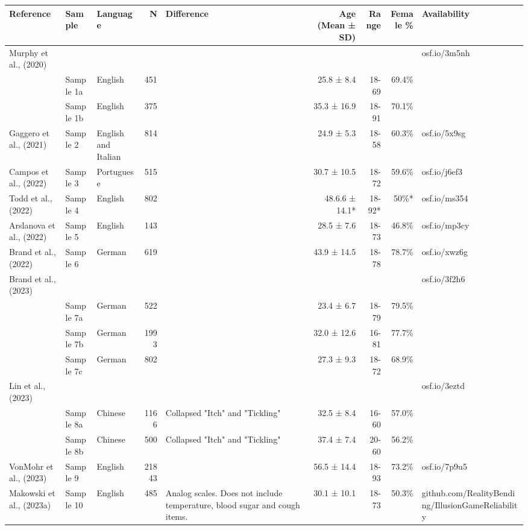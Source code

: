 \begin{table}[!t]
\fontsize{6.8pt}{8.1pt}\selectfont
\begin{tabular*}{\linewidth}{@{\extracolsep{\fill}}lllrlrrrl}
\toprule
Reference & Sample & Language & N & Difference & Age (Mean  ± SD) & Range & Female \% & Availability \\ 
\midrule\addlinespace[2.5pt]
Murphy et al., (2020) &  &  &  &  &  &  &  & osf.io/3m5nh \\ 
 & Sample 1a & English & 451 &  & 25.8 ± 8.4 & 18-69 & 69.4\% &  \\ 
 & Sample 1b & English & 375 &  & 35.3 ± 16.9 & 18-91 & 70.1\% &  \\ 
Gaggero et al., (2021) & Sample 2 & English and Italian & 814 &  & 24.9 ± 5.3 & 18-58 & 60.3\% & osf.io/5x9sg \\ 
Campos et al., (2022) & Sample 3 & Portuguese & 515 &  & 30.7 ± 10.5 & 18-72 & 59.6\% & osf.io/j6ef3 \\ 
Todd et al., (2022) & Sample 4 & English & 802 &  & 48.6.6 ± 14.1* & 18-92* & 50\%* & osf.io/ms354 \\ 
Arslanova et al., (2022) & Sample 5 & English & 143 &  & 28.5 ± 7.6 & 18-73 & 46.8\% & osf.io/mp3cy \\ 
Brand et al., (2022) & Sample 6 & German & 619 &  & 43.9 ± 14.5 & 18-78 & 78.7\% & osf.io/xwz6g \\ 
Brand et al., (2023) &  &  &  &  &  &  &  & osf.io/3f2h6 \\ 
 & Sample 7a & German & 522 &  & 23.4 ± 6.7 & 18-79 & 79.5\% &  \\ 
 & Sample 7b & German & 1993 &  & 32.0 ± 12.6 & 16-81 & 77.7\% &  \\ 
 & Sample 7c & German & 802 &  & 27.3 ± 9.3 & 18-72 & 68.9\% &  \\ 
Lin et al., (2023) &  &  &  &  &  &  &  & osf.io/3eztd \\ 
 & Sample 8a & Chinese & 1166 & Collapsed "Itch" and "Tickling" & 32.5 ± 8.4 & 16-60 & 57.0\% &  \\ 
 & Sample 8b & Chinese & 500 & Collapsed "Itch" and "Tickling" & 37.4 ± 7.4 & 20-60 & 56.2\% &  \\ 
VonMohr et al., (2023) & Sample 9 & English & 21843 &  & 56.5 ± 14.4 & 18-93 & 73.2\% & osf.io/7p9u5 \\ 
Makowski et al., (2023a) & Sample 10 & English & 485 & Analog scales. Does not include temperature, blood sugar and cough items. & 30.1 ± 10.1 & 18-73 & 50.3\% & github.com/RealityBending/IllusionGameReliability \\ 

\end{tabular*}
\end{table}
